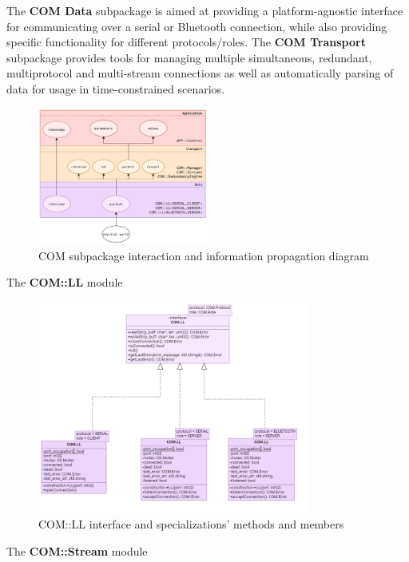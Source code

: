 The \textbf{COM Data} subpackage is aimed at providing a platform-agnostic interface for communicating over a serial or Bluetooth connection, while also providing specific functionality for different protocols/roles.
The \textbf{COM Transport} subpackage provides tools for managing multiple simultaneous, redundant, multiprotocol and multi-stream connections as well as automatically parsing of data for usage in time-constrained scenarios.

\begin{figure}[H]
	\centering
	\includegraphics[width=0.5\textwidth]{./img/module-stack-com.png}
	\caption {COM subpackage interaction and information propagation diagram}
	\label{fig:navig-module-stack-com}
	\end{figure}



The \textbf{COM::LL} module 

\begin{figure}[H]
	\centering
	\includegraphics[width=0.8\textwidth]{./img/navig-class-ll.png}
	\caption {COM::LL interface and specializations' methods and members}
	\label{fig:navig-class-ll}
	\end{figure}


The \textbf{COM::Stream} module 

